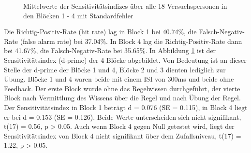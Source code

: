 \documentclass[doc,a4paper,12pt]{apa6}
\begin{document}
\begin{figure}[t]
  \centering
  \begin{minipage}{\textwidth}
    \vspace{10pt}
    \caption{Mittelwerte der Sensitivitätsindizes über alle 18 Versuchspersonen in den Blöcken 1 - 4 mit Standardfehler}
    \label{dprime}
  \end{minipage}
\end{figure}

Die Richtig-Positiv-Rate (hit rate) lag in Block 1 bei 40.74\%, die Falsch-Negativ-Rate (false alarm rate) bei 37.04\%. In Block 4 lag die Richtig-Positiv-Rate dann bei 41.67\%, die Falsch-Negativ-Rate bei 35.65\%. In Abbildung \ref{dprime} ist der Sensitivitätsindex (d-prime) der 4 Blöcke abgebildet. Von Bedeutung ist an dieser Stelle der d-prime der Blöcke 1 und 4, Blöcke 2 und 3 dienten lediglich zur Übung.  Blöcke 1 und 4 waren beide mit einem ISI von 300ms und beide ohne Feedback. Der erste Block wurde ohne das Regelwissen durchgeführt, der vierte Block nach Vermittlung des Wissens über die Regel und nach Übung der Regel. Der Sensitivitätsindex in Block 1 beträgt d = 0.076 (SE = 0.115), in Block 4 liegt er bei d = 0.153 (SE = 0.126). Beide Werte unterscheiden sich nicht signifikant, t(17) = 0.56, p > 0.05. Auch wenn Block 4 gegen Null getestet wird, liegt der Sensitivitätsindex von Block 4 nicht signifikant über dem Zufallsniveau, t(17) = 1.22, p > 0.05.
\end{document}
